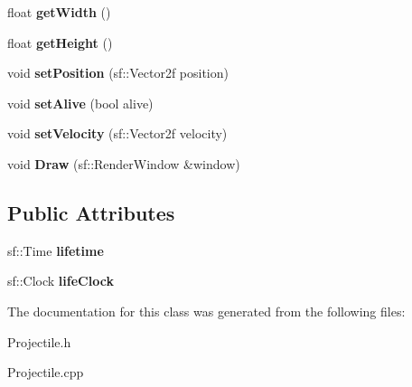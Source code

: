 \begin{DoxyCompactItemize}
float {\bfseries get\+Width} ()
\item 
\mbox{\label{class_projectile_a70d55ea52a1d6cdaf74c894d412597d1}} 
float {\bfseries get\+Height} ()
\item 
\mbox{\label{class_projectile_ae07f879ff7091e007f89e1e875f08962}} 
void {\bfseries set\+Position} (sf\+::\+Vector2f position)
\item 
\mbox{\label{class_projectile_a7125bb834b93eb0dbe6484c015949e80}} 
void {\bfseries set\+Alive} (bool alive)
\item 
\mbox{\label{class_projectile_a98891d8de7607df133f975ec8e249ccf}} 
void {\bfseries set\+Velocity} (sf\+::\+Vector2f velocity)
\item 
\mbox{\label{class_projectile_a0c13be2f57f656bae015fa3ecfffa572}} 
void {\bfseries Draw} (sf\+::\+Render\+Window \&window)
\end{DoxyCompactItemize}
\subsection*{Public Attributes}
\begin{DoxyCompactItemize}
\item 
\mbox{\label{class_projectile_ada05bf23fbcb757cd7121dec3d0a72bd}} 
sf\+::\+Time {\bfseries lifetime}
\item 
\mbox{\label{class_projectile_a2a4fb9a99683ea017ca05a8a0d8a670c}} 
sf\+::\+Clock {\bfseries life\+Clock}
\end{DoxyCompactItemize}


The documentation for this class was generated from the following files\+:\begin{DoxyCompactItemize}
\item 
Projectile.\+h\item 
Projectile.\+cpp\end{DoxyCompactItemize}
